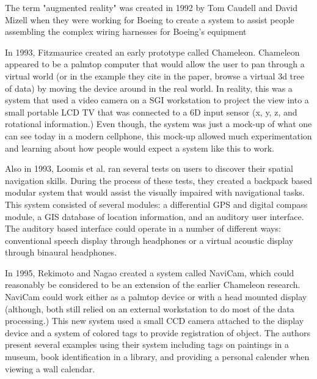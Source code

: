 \documentclass{acm_proc_article-sp}
\begin{document}
The term "augmented reality" was created in 1992 by Tom Caudell and David Mizell when they were working for Boeing to create a system to assist people assembling the complex wiring harnesses for Boeing's equipment \cite{citeulike:6081386} \cite{carmigniani2011augmented}

In 1993, Fitzmaurice created an early prototype called Chameleon.  Chameleon appeared to be a palmtop computer that would allow the user to pan through a virtual world (or in the example they cite in the paper, browse a virtual 3d tree of data) by moving the device around in the real world.  In reality, this was a system that used a video camera on a SGI workstation to project the view into a small portable LCD TV that was connected to a 6D input sensor (x, y, z, and rotational information.)  Even though, the system was just a mock-up of what one can see today in a modern cellphone, this mock-up allowed much experimentation and learning about how people would expect a system like this to work.\cite{fitzmaurice1993situated}

Also in 1993, Loomis et al. ran several tests on users to discover their spatial navigation skills.  \cite{loomis1993nonvisual} During the process of these tests, they created a backpack based modular system that would assist the visually impaired with navigational tasks.  This system consisted of several modules: a differential GPS and digital compass module, a GIS database of location information, and an auditory user interface.  The auditory based interface could operate in a number of different ways: conventional speech display through headphones or a virtual acoustic display through binaural headphones. \cite{loomis1994personal}

In 1995, Rekimoto and Nagao created a system called NaviCam, which could reasonably be considered to be an extension of the earlier Chameleon research. \cite{fitzmaurice1993situated}  NaviCam could work either as a palmtop device or with a head mounted display (although, both still relied on an external workstation to do most of the data processing.)  This new system used a small CCD camera attached to the display device and a system of colored tags to provide registration of object.  The authors present several examples using their system including tags on paintings in a museum, book identification in a library, and providing a personal calender when viewing a wall calendar. \cite{rekimoto1995world}
\end{document}

